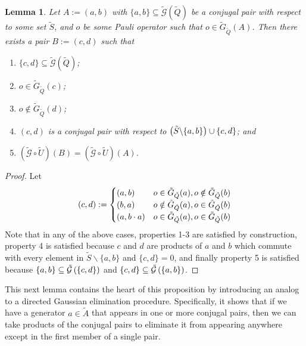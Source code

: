 \documentclass[twocolumn,showpacs,preprintnumbers,amsmath,amssymb,nofootinbib,pra,floatfix]{revtex4-1}
\newtheorem{lemma}{Lemma}
\newenvironment{remark}[1][Remark]{\begin{trivlist}
\item[\hskip \labelsep {\bfseries #1}]}{\end{trivlist}}
\newcommand{\set}{\tilde}
\newcommand{\genfun}{\tilde{\mathcal{G}}}
\begin{document}
\begin{lemma}
\label{single-pair-rearrangement}
Let $A:=(a,b)$ with $\{a,b\}\subseteq\genfun(\set Q)$ be a conjugal pair with respect to some set $\set S$, and $o$ be some Pauli operator such that $o\in\set G_{\set Q}(A)$.  Then there exists a pair $B:=(c,d)$ such that
\begin{enumerate}
\item $\{c,d\}\subseteq\genfun(\set Q)$;
\item $o\in \set G_{\set Q}(c)$;
\item $o\notin \set G_{\set Q}(d)$;
\item $(c,d)$ is a conjugal pair with respect to $\paren{\set S\backslash \{a,b\}}\cup\{c,d\}$; and
\item $(\genfun\circ\set U)(B) = (\genfun\circ\set U)(A)$.
\end{enumerate}
\end{lemma}

\begin{proof}
Let
$$
(c,d):=
\begin{cases}
\paren{a,b} & o\in \set G_{\set Q}(a), o\notin \set G_{\set Q}(b) \\
\paren{b,a} &  o\notin \set G_{\set Q}(a), o\in \set G_{\set Q}(b) \\
\paren{a,b\cdot a} & o\in \set G_{\set Q}(a), o\in \set G_{\set Q}(b) \\
\end{cases}
$$
Note that in any of the above cases, properties 1-3 are satisfied by construction, property 4 is satisfied because $c$ and $d$ are products of $a$ and $b$ which commute with every element in $\set S\backslash \{a,b\}$ and $\{c,d\}=0$, and finally property 5 is satisfied because $\{a,b\}\subseteq \genfun\paren{\{c,d\}}$ and $\{c,d\}\subseteq \genfun\paren{\{a,b\}}$.
\end{proof}
\begin{remark}
This next lemma contains the heart of this proposition by introducing an analog to a directed Gaussian elimination procedure.  Specifically, it shows that if we have a generator $a\in\set A$ that appears in one or more conjugal pairs, then we can take products of the conjugal pairs to eliminate it from appearing anywhere except in the first member of a single pair.
\end{remark}
\end{document}
